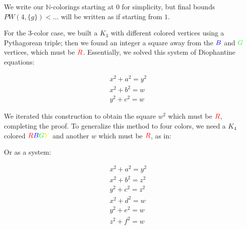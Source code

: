 \documentclass[a4paper]{amsproc}
\theoremstyle{plain}
\newcommand{\RR} {\color{red} R}
\newcommand{\BB} {\color{blue} B}
\newcommand{\GG} {\color{green} G}
\newcommand{\YY} {\color{yellow} Y}
\newcommand{\N} {\mathbb{N}}
\begin{document}
We write our $\N$-colorings starting at $0$ for simplicity, but final bounds \\${PW(4, \{g\}) < \ldots}$ will be written as if starting from $1$.

For the 3-color case, we built a $K_3$ with different colored vertices using a Pythagorean triple;
then we found an integer a square away from the $\BB$ and $\GG$ vertices, which must be $\RR$.
Essentially, we solved this system of Diophantine equations:

$$
\begin{matrix}
x^2 + a^2 = y^2 \\
x^2 + b^2 = w \\
y^2 + c^2 = w
\end{matrix}
$$

We iterated this construction to obtain the square $w^2$ which must be $\RR$, completing the proof.
To generalize this method to four colors, we need a $K_4$ colored $\RR\BB\GG\YY$ and another $w$ which must be $\RR$, as in:

\begin{figure}[H]
\caption{}
\label{fig:M4}
\end{figure}

Or as a system:

$$
\begin{matrix}
x^2 + a^2 = y^2 \\
x^2 + b^2 = z^2 \\
y^2 + c^2 = z^2 \\
x^2 + d^2 = w \\
y^2 + e^2 = w \\
z^2 + f^2 = w
\end{matrix}
$$
\end{document}
